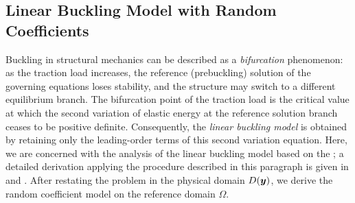\subsection{Linear Buckling Model with Random Coefficients}\label{section:linearbuckingformulation}
Buckling in structural mechanics can be described as a \emph{bifurcation} phenomenon: as the traction load increases, the reference (prebuckling) solution of the governing equations loses stability, and the structure may switch to a different equilibrium branch. The bifurcation point of the traction load is the critical value at which the second variation of elastic energy at the reference solution branch ceases to be positive definite. Consequently, the \emph{linear buckling model} is obtained by retaining only the leading-order terms of this second variation equation. Here, we are concerned with the analysis of the linear buckling model based on the \cite{DaugeandSuriNumericalapproximation}; a detailed derivation applying the procedure described in this paragraph is given in \cite[Section~2]{Grabovsky2007TheFS} and \cite[Section 2]{HarutyunyanBuckling}. After restating the problem in the physical domain $D({\boldsymbol{y}})$, we derive the random coefficient model on the reference domain $\Omega$.



